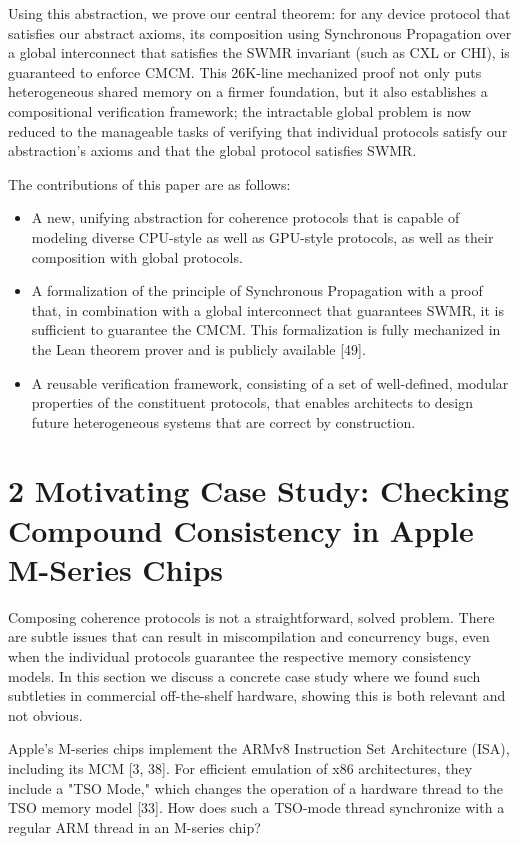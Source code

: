 \documentclass[10pt]{article}
\begin{document}
Using this abstraction, we prove our central theorem: for any device protocol that satisfies our abstract axioms, its composition using Synchronous Propagation over a global interconnect that satisfies the SWMR invariant (such as CXL or CHI), is guaranteed to enforce CMCM. This 26K-line mechanized proof not only puts heterogeneous shared memory on a firmer foundation, but it also establishes a compositional verification framework; the intractable global problem is now reduced to the manageable tasks of verifying that individual protocols satisfy our abstraction's axioms and that the global protocol satisfies SWMR.

The contributions of this paper are as follows:

\begin{itemize}
  \item[-] A new, unifying abstraction for coherence protocols that is capable of modeling diverse CPU-style as well as GPU-style protocols, as well as their composition with global protocols.
  \item[-] A formalization of the principle of Synchronous Propagation with a proof that, in combination with a global interconnect that guarantees SWMR, it is sufficient to guarantee the CMCM. This formalization is fully mechanized in the Lean theorem prover and is publicly available [49].
  \item[-] A reusable verification framework, consisting of a set of well-defined, modular properties of the constituent protocols, that enables architects to design future heterogeneous systems that are correct by construction.
\end{itemize}

\section*{2 Motivating Case Study: Checking Compound Consistency in Apple M-Series Chips}
Composing coherence protocols is not a straightforward, solved problem. There are subtle issues that can result in miscompilation and concurrency bugs, even when the individual protocols guarantee the respective memory consistency models. In this section we discuss a concrete case study where we found such subtleties in commercial off-the-shelf hardware, showing this is both relevant and not obvious.

Apple's M-series chips implement the ARMv8 Instruction Set Architecture (ISA), including its MCM [3, 38]. For efficient emulation of x86 architectures, they include a "TSO Mode," which changes the operation of a hardware thread to the TSO memory model [33]. How does such a TSO-mode thread synchronize with a regular ARM thread in an M-series chip?
\end{document}
